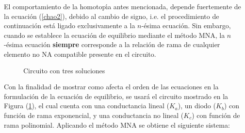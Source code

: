 \documentclass[conference,letterpaper,onecolumn]{IEEEtran}
\begin{document}
El comportamiento de la homotop\'{\i}a antes mencionada, depende
fuertemente de la ecuaci\'on (\ref{chao2}), debido al cambio de signo,
i.e. el procedimiento de continuaci\'on est\'a ligado exclusivamente
a la $n$-\'esima ecuaci\'on. Sin embargo, cuando se establece la
ecuaci\'on de equilibrio mediante el m\'etodo MNA, la $n$-\'esima
ecuaci\'on {\bf siempre} corresponde a la relaci\'on de rama de
cualquier elemento no NA compatible presente en el circuito.

\begin{figure}[t]
\centerline{
\epsfxsize=70mm
}
\caption{Circuito con tres soluciones}
\label{cirejemplo}
\end{figure}

Con la finalidad de mostrar como afecta el orden de las ecuaciones en
la formulaci\'on de la ecuaci\'on de equilibrio, se usar\'a el
circuito mostrado en la Figura (\ref{cirejemplo}), el cual cuenta
con una conductancia lineal ({$K_a$}), un diodo ({$K_b$}) con funci\'on
de rama exponencial, y una
conductancia no lineal ($K_c$) con funci\'on de rama polinomial.
Aplicando el m\'etodo MNA se obtiene el siguiente sistema:
\end{document}
